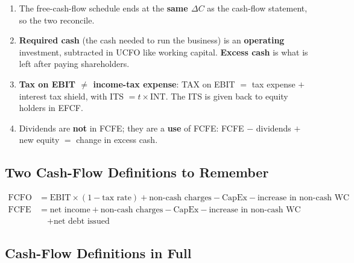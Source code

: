 \begin{addbox}
\begin{enumerate}[leftmargin=*]
  \item The free-cash-flow schedule ends at the \textbf{same $\Delta C$} as the cash-flow statement, so the two reconcile.
  \item \textbf{Required cash} (the cash needed to run the business) is an \textbf{operating} investment, subtracted in UCFO like working capital. \textbf{Excess cash} is what is left after paying shareholders.
  \item \textbf{Tax on EBIT $\neq$ income-tax expense}: TAX on EBIT $=$ tax expense $+$ interest tax shield, with ITS $=t\times$INT. The ITS is given back to equity holders in EFCF.
  \item Dividends are \textbf{not} in FCFE; they are a \textbf{use} of FCFE: FCFE $-$ dividends $+$ new equity $=$ change in excess cash.
\end{enumerate}
\end{addbox}

\subsection{Two Cash-Flow Definitions to Remember}

\begin{keybox}
\begin{align*}
\text{FCFO} &= \text{EBIT}\times(1-\text{tax rate}) + \text{non-cash charges} - \text{CapEx} - \text{increase in non-cash WC}\\[4pt]
\text{FCFE} &= \text{net income} + \text{non-cash charges} - \text{CapEx} - \text{increase in non-cash WC}\\
&\quad + \text{net debt issued}
\end{align*}
\end{keybox}

\subsection{Cash-Flow Definitions in Full}

